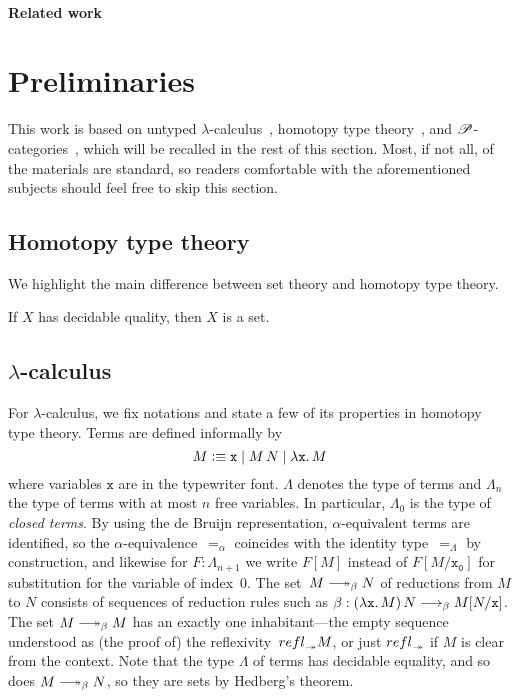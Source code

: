 \documentclass[a4paper,UKenglish,numberwithinsect,cleveref,thm-restate]{lipics-v2021}
\numberwithin{equation}{section}
\theoremstyle{plain}
\begin{document}
\paragraph*{Related work}
\cite{Visser2019,Beklemishev2006}
\cite{Kavvos2020}
\cite{Shamkanov2014,Shamkanov2016a}

\section{Preliminaries}\label{sec:preliminaries}
This work is based on untyped $\lambda$-calculus~\cite{Barendregt1984a}, homotopy type theory~\cite{hottbook}, and $\mathscr{P}$-categories~\cite{Cubric1998a}, which will be recalled in the rest of this section.
Most, if not all, of the materials are standard, so readers comfortable with the aforementioned subjects should feel free to skip this section.

\subsection{Homotopy type theory}
We highlight the main difference between set theory and homotopy type theory.
\begin{theorem}[Hedberg]
  If $X$ has decidable quality, then $X$ is a set.
\end{theorem}

\subsection{\texorpdfstring{$\lambda$}{λ}-calculus}
For $\lambda$-calculus, we fix notations and state a few of its properties in homotopy type theory.
Terms are defined informally by
\[
  M \vcentcolon\equiv \mathtt{x} \mid M\,N \mid \lambda \mathtt{x}.\, M
\]
where variables $\mathtt{x}$ are in the typewriter font.
$\Lambda$ denotes the type of terms and $\Lambda_n$ the type of terms with at most $n$ free variables.
In particular, $\Lambda_0$ is the type of \emph{closed terms}.
By using the de Bruijn representation, $\alpha$-equivalent terms are identified, so the $\alpha$-equivalence~$=_\alpha$ coincides with the identity type~$=_\Lambda$ by construction, and likewise for $F : \Lambda_{n+1}$ we write $F[M]$ instead of $F[M/\mathtt{x_0}]$ for substitution for the variable of index~$0$.
The set~$M \reduce N$ of reductions from $M$ to $N$ consists of sequences of reduction rules such as $\beta : (\lambda \mathtt{x}.\,M)\,N \longrightarrow_{\beta} M [ N / \mathtt{x} ]$.
The set $M \reduce M$ has an exactly one inhabitant---the empty sequence understood as (the proof of) the reflexivity~$\refl_\twoheadrightarrow M$, or just $\refl_\twoheadrightarrow$ if $M$ is clear from the context.
Note that the type $\Lambda$ of terms has decidable equality, and so does $M \reduce N$, so they are sets by Hedberg's theorem.
\end{document}
